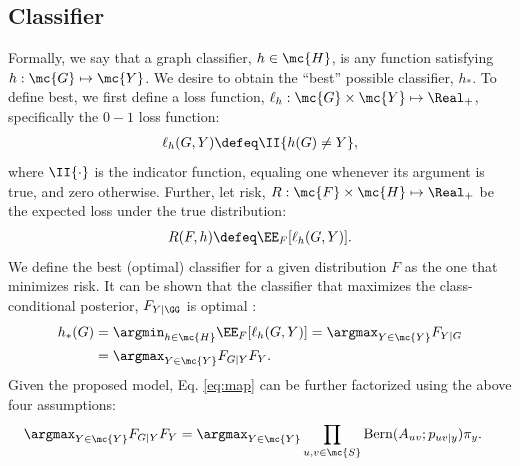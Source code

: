 \documentclass[10pt,journal,cspaper,compsoc]{IEEEtran}
\begin{document}

\subsection{Classifier} %
\label{sub:classifier}



Formally, we say that a graph classifier, $h \in \mc{H}$, is any function satisfying $h: \mc{G} \mapsto \mc{Y}$.  We desire to obtain the ``best'' possible classifier, $h_*$. To define best, we first define a loss function, $\ell_h: \mc{G} \times \mc{Y} \mapsto \Real_+$, specifically the $0-1$ loss function:
\begin{align}
\ell_h(G,Y) \defeq \II \{h(G) \neq Y\}, %
\end{align}
where $\II\{\cdot\}$ is the indicator function, equaling one whenever its argument is true, and zero otherwise.  Further, let risk, $R: \mc{F} \times \mc{H} \mapsto \Real_+$ be the expected loss under the true distribution:
\begin{align}
R(F,h) \defeq \EE_F[\ell_h(G,Y)].
\end{align}
We define the best (optimal) classifier for a given distribution $F$ as the one that minimizes risk.
It can be shown that the classifier that maximizes the class-conditional posterior, $F_{Y | \GG}$ is optimal \cite{Bickel2000}:
\begin{align} \label{eq:map}
h_*(G) &= \argmin_{h \in \mc{H}} \EE_F[\ell_h (G,Y)] = \argmax_{Y \in \mc{Y}} F_{Y|G} 
\nonumber \\ &= \argmax_{Y \in \mc{Y}} F_{G|Y} F_Y.
\end{align}
Given the proposed model, Eq. \eqref{eq:map} can be further factorized using the above four assumptions:
\begin{align}
\argmax_{Y \in \mc{Y}} F_{G|Y} F_Y 
&= \argmax_{Y \in \mc{Y}} \prod_{u,v \in \mc{S}} \text{Bern}(A_{uv}; p_{uv|y}) \pi_y.
\end{align}
\end{document}
